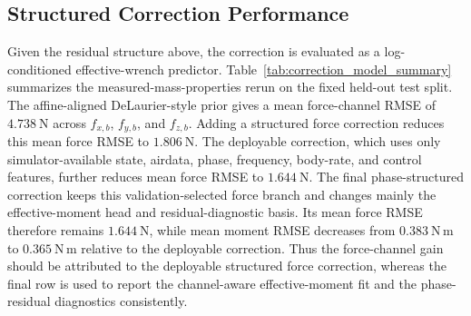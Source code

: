 \subsection{Structured Correction Performance}
\label{subsec:prediction_performance}

Given the residual structure above, the correction is evaluated as a log-conditioned effective-wrench predictor. Table~\ref{tab:correction_model_summary} summarizes the measured-mass-properties rerun on the fixed held-out test split. The affine-aligned DeLaurier-style prior gives a mean force-channel RMSE of $4.738~\mathrm{N}$ across $f_{x,b}$, $f_{y,b}$, and $f_{z,b}$. Adding a structured force correction reduces this mean force RMSE to $1.806~\mathrm{N}$. The deployable correction, which uses only simulator-available state, airdata, phase, frequency, body-rate, and control features, further reduces mean force RMSE to $1.644~\mathrm{N}$. The final phase-structured correction keeps this validation-selected force branch and changes mainly the effective-moment head and residual-diagnostic basis. Its mean force RMSE therefore remains $1.644~\mathrm{N}$, while mean moment RMSE decreases from $0.383~\mathrm{N\,m}$ to $0.365~\mathrm{N\,m}$ relative to the deployable correction. Thus the force-channel gain should be attributed to the deployable structured force correction, whereas the final row is used to report the channel-aware effective-moment fit and the phase-residual diagnostics consistently.

\begin{table}[t]
\centering
\caption{Held-out test summary for the measured-mass-properties branch. The final phase-structured row keeps the deployable force branch and mainly changes the effective-moment head and diagnostic basis. Force and moment summaries are simple means of per-channel RMSE or MAE; Table~\ref{tab:measured_massprops_target_results} gives the main per-channel evidence.}
\label{tab:correction_model_summary}
\end{table}

